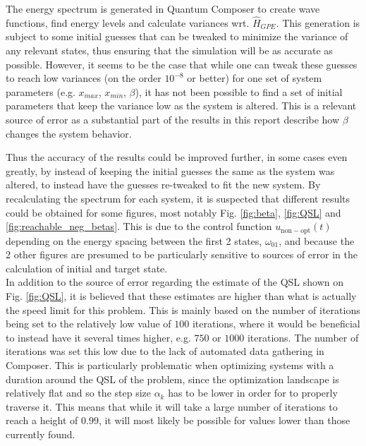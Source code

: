 \documentclass[a4paper, twocolumn]{revtex4-1}
\begin{document}
The energy spectrum is generated in Quantum Composer to create wave functions, find energy levels and calculate variances wrt. $\hat{H}_{GPE}$. This generation is subject to some initial guesses that can be tweaked to minimize the variance of any relevant states, thus ensuring that the simulation will be as accurate as possible. However, it seems to be the case that while one can tweak these guesses to reach low variances (on the order $10^{-8}$ or better) for one set of system parameters (e.g. $x_{max}$, $x_{min}$, $\beta$), it has not been possible to find a set of initial parameters that keep the variance low as the system is altered. This is a relevant source of error as a substantial part of the results in this report describe how $\beta$ changes the system behavior. 

Thus the accuracy of the results could be improved further, in some cases even greatly, by instead of keeping the initial guesses the same as the system was altered, to instead have the guesses re-tweaked to fit the new system. By recalculating the spectrum for each system, it is suspected that different results could be obtained for some figures, most notably Fig. \ref{fig:beta}, \ref{fig:QSL} and \ref{fig:reachable_neg_betas}. This is due to the control function $u_{\mathrm{non-opt}}(t)$ depending on the energy spacing between the first 2 states, $\omega_{01}$, and because the 2 other figures are presumed to be particularly sensitive to sources of error in the calculation of initial and target state.   \\

In addition to the source of error regarding the estimate of the QSL shown on Fig. \ref{fig:QSL}, it is believed that these estimates are higher than what is actually the speed limit for this problem. This is mainly based on the number of  iterations being set to the relatively low value of $100$ iterations, where it would be beneficial to instead have it several times higher, e.g. $750$ or $1000$ iterations. The number of iterations was set this low due to the lack of automated data gathering in Composer. This is particularly problematic when optimizing systems with a duration around the QSL of the problem, since the optimization landscape is relatively flat and so the step size $\alpha_k$ has to be lower in order for  to properly traverse it. This means that while it will take a large number of iterations to reach a height of $0.99$, it will most likely be possible for values lower than those currently found. 
\end{document}

